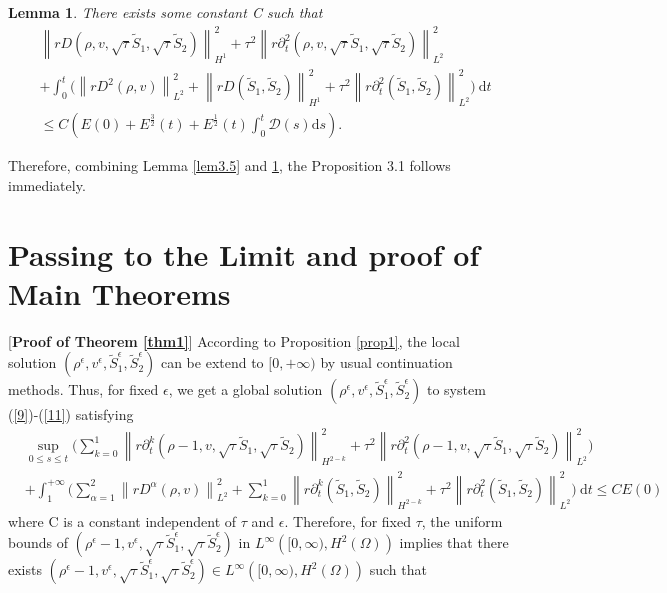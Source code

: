 \documentclass[10pt,reqno]{amsart}
\numberwithin{equation}{section}
\newtheorem{lemma}[theorem]{Lemma}
\begin{document}
	\begin{lemma}\label{lem10}
		There exists some constant C such that
		\begin{equation}
			\begin{aligned}
				&\left\|rD(\rho, v, \sqrt{\tau} \tilde{S}_1, \sqrt{\tau} \tilde{S}_2)\right\|_{H^{1}}^2
				+\tau^2\left\|r\partial_{t}^2(\rho, v, \sqrt{\tau} \tilde{S}_1, \sqrt{\tau} \tilde{S}_2)\right\|_{L^{2}}^2\\
				&+\int_{0}^{t}\bigg(\left\|r D^2(\rho, v)\right\|_{L^2}^2
				+\left\|rD(\tilde{S}_1, \tilde{S}_2)\right\|_{H^{1}}^2
				+\tau^2\left\|r\partial_{t}^2(\tilde{S}_1,\tilde{S}_2)\right\|_{L^{2}}^2\bigg)\mathrm{~d} t\\&
				\leq C \left(E(0)+E^{\frac{3}{2}}(t)+E^{\frac{1}{2}}(t) \int_{0}^{t}\mathcal{D}(s)\mathrm{d}s\right).
			\end{aligned}
		\end{equation}
	\end{lemma}
	Therefore, combining Lemma \ref{lem3.5} and \ref{lem10}, the Proposition 3.1 follows immediately.
	
	\section{Passing to the Limit and proof of Main Theorems}
	
	[\textbf{Proof of Theorem \ref{thm1}}]
	According to Proposition \ref{prop1}, the local solution $(\rho^\epsilon,v^\epsilon,\tilde{S}_1^{\epsilon},\tilde{S}_2^{\epsilon})$ can
	be extend to $[0,+\infty)$ by usual continuation methods. Thus, for fixed $\epsilon$, we get a global solution
	$(\rho^\epsilon,v^\epsilon,\tilde{S}_1^{\epsilon},\tilde{S}_2^{\epsilon})$ to system (\ref{9})-(\ref{11}) satisfying
	\begin{equation}\label{4.1}
		\begin{aligned}
			&\sup _{0 \leq s \leq t}\bigg( \sum_{k=0}^1\left\|r\partial_{t}^k(\rho-1, v, \sqrt{\tau} \tilde{S}_1, \sqrt{\tau} \tilde{S}_2)\right\|_{H^{2-k}}^2
			+\tau^2\left\|r\partial_{t}^2(\rho-1, v, \sqrt{\tau} \tilde{S}_1, \sqrt{\tau} \tilde{S}_2)\right\|_{L^{2}}^2\bigg)\\
			&+\int_{1}^{+\infty}\bigg(\sum_{\alpha=1}^2\left\|r D^\alpha(\rho, v)\right\|_{L^2}^2
			+\sum_{k=0}^1\left\|r\partial_{t}^k(\tilde{S}_1, \tilde{S}_2)\right\|_{H^{2-k}}^2
			+\tau^2\left\|r\partial_{t}^2(\tilde{S}_1,\tilde{S}_2)\right\|_{L^{2}}^2\bigg)\mathrm{~d} t
			\leq C E(0)
		\end{aligned}
	\end{equation}
	where C is a constant independent of $\tau$ and $\epsilon$. Therefore, for fixed $\tau$, the uniform bounds of $(\rho^\epsilon-1,v^\epsilon, \sqrt{\tau}\tilde{S}_1^{\epsilon}, \sqrt{\tau}\tilde{S}_2^{\epsilon})$ in $L^{\infty}\left([0,\infty), H^2(\Omega)\right)$
	implies that there exists $(\rho^\epsilon-1,v^\epsilon, \sqrt{\tau}\tilde{S}_1^{\epsilon}, \sqrt{\tau}\tilde{S}_2^{\epsilon})
	\in  L^{\infty}\left([0,\infty), H^2(\Omega)\right)$ such that
	
\end{document}
